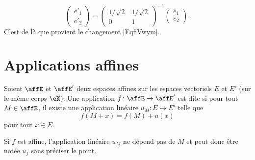 \begin{example}
\begin{equation}
        \begin{pmatrix}
            e'_1    \\
            e'_2
        \end{pmatrix}=\begin{pmatrix}
            1/\sqrt{2}    &   1/\sqrt{2}    \\
            0    &   1
        \end{pmatrix}^{-1}\begin{pmatrix}
            e_1    \\
            e_2
        \end{pmatrix}.
    \end{equation}
    C'est de là que provient le changement \eqref{EqfiVwym}.
\end{example}

\section{Applications affines}

\begin{definition}      \label{DEFooUAWZooXcMKve}
    Soient \( \affE\) et \( \affE'\) deux espaces affines sur les espaces vectoriels \( E\) et \( E'\) (sur le même corps \( \eK\)). Une application \( f\colon \affE\to \affE'\) est dite  si pour tout \( M\in \affE\), il existe une application linéaire \( u_M\colon E\to E'\) telle que
    \begin{equation}    \label{EqMqIoWX}
        f(M+x)=f(M)+u(x)
    \end{equation}
    pour tout \( x\in E\).
\end{definition}

\begin{lemma}       \label{LEMooYJCDooOGAHkF}
    Si \( f\) est affine, l'application linéaire \( u_M\) ne dépend pas de \( M\) et peut donc être notée \( u_f\) sans préciser le point.
\end{lemma}


